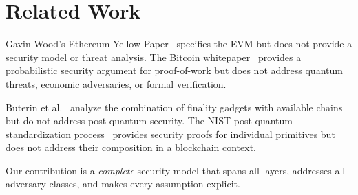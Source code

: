 \section{Related Work}

\label{sec:related}

Gavin Wood's Ethereum Yellow Paper~\cite{wood2014ethereum} specifies the EVM but does
not provide a security model or threat analysis. The Bitcoin whitepaper~\cite{nakamoto2008bitcoin}
provides a probabilistic security argument for proof-of-work but does not address
quantum threats, economic adversaries, or formal verification.

Buterin et al.~\cite{buterin2020combining} analyze the combination of finality
gadgets with available chains but do not address post-quantum security. The NIST
post-quantum standardization process~\cite{fips204} provides security proofs for
individual primitives but does not address their composition in a blockchain context.

Our contribution is a \emph{complete} security model that spans all layers,
addresses all adversary classes, and makes every assumption explicit.

